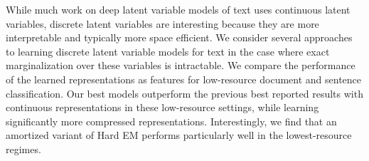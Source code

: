 While much work on deep latent variable models of text uses continuous latent variables, discrete latent variables are interesting because they are more interpretable and typically more space efficient. We consider several approaches to learning discrete latent variable models for text in the case where exact marginalization over these variables is intractable. We compare the performance of the learned representations as features for low-resource document and sentence classification. Our best models outperform the previous best reported results with continuous representations in these low-resource settings, while learning significantly more compressed representations. Interestingly, we find that an amortized variant of Hard EM performs particularly well in the lowest-resource regimes.

